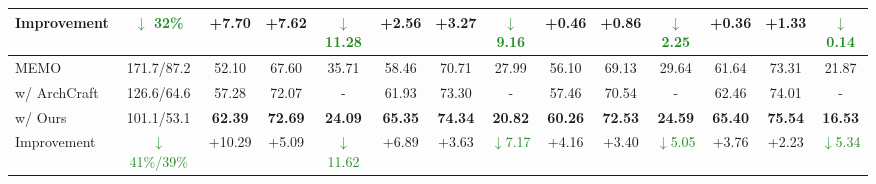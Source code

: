 \begin{table}[t]
{\begin{tabular}{@{\hspace{2mm}}lccccccccccccc@{\hspace{2mm}}}
        \cmidrule(lr){1-14}
        Improvement &\textcolor{forestgreen}{$\downarrow$ 32\%} &\textcolor{forestred}{+7.70} &\textcolor{forestred}{+7.62} &\textcolor{forestgreen}{$\downarrow$11.28} &\textcolor{forestred}{+2.56} &\textcolor{forestred}{+3.27} &\textcolor{forestgreen}{$\downarrow$9.16} &\textcolor{forestred}{+0.46} &\textcolor{forestred}{+0.86} &\textcolor{forestgreen}{$\downarrow$2.25} &\textcolor{forestred}{+0.36} &\textcolor{forestred}{+1.33} &\textcolor{forestgreen}{$\downarrow$0.14}\\
        \midrule
        MEMO &171.7/87.2 &52.10 &67.60 &35.71 &58.46 &70.71 &27.99 &56.10  &69.13 &29.64  &61.64  &73.31 &21.87\\ %
        \color{ac_gray}
        w/ ArchCraft &126.6/64.6 &57.28 &72.07 &- &61.93 &73.30 &- &57.46 &70.54 &- &62.46 &74.01 &-\\
        w/ Ours &101.1/53.1 &\textbf{62.39} &\textbf{72.69} &\textbf{24.09} &\textbf{65.35} &\textbf{74.34} &\textbf{20.82} &\textbf{60.26} &\textbf{72.53} &\textbf{24.59} &\textbf{65.40} &\textbf{75.54} &\textbf{16.53}\\
        \cmidrule(lr){1-14}
        Improvement &\textcolor{forestgreen}{$\downarrow$ 41\%/39\%} &\textcolor{forestred}{+10.29} &\textcolor{forestred}{+5.09} &\textcolor{forestgreen}{$\downarrow$11.62} &\textcolor{forestred}{+6.89} &\textcolor{forestred}{+3.63} &\textcolor{forestgreen}{$\downarrow$7.17} &\textcolor{forestred}{+4.16} &\textcolor{forestred}{+3.40} &\textcolor{forestgreen}{$\downarrow$5.05} &\textcolor{forestred}{+3.76} &\textcolor{forestred}{+2.23} &\textcolor{forestgreen}{$\downarrow$5.34}\\
        \bottomrule
    \end{tabular}
    }
\end{table}

